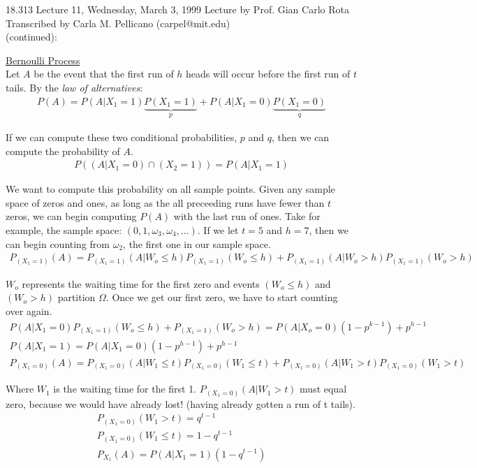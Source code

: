 {\Large 18.313 Lecture 11, Wednesday, March 3, 1999}\newline
{\large Lecture by Prof. Gian Carlo Rota}\\
Transcribed by Carla M. Pellicano (carpel@mit.edu)\\

 (continued):

\noindent\underline{Bernoulli Process}\\
Let $A$ be the event that the first run of $h$ heads will occur before the first run of $t$ tails.  By the {\em law of alternatives}:
\begin{eqnarray*}
P(A)=P(A|X_1=1)\underbrace{P(X_1=1)}_{p}+P(A|X_1=0)\underbrace{P(X_1=0)}_{q}
\end{eqnarray*}

If we can compute these two conditional probabilities, $p$ and $q$, then we can compute the probability of $A$. 
\begin{eqnarray*}
P((A|X_1=0)\cap(X_2=1))=P(A|X_1=1)
\end{eqnarray*}

We want to compute this probability on all sample points.  Given any sample space of zeros and ones, as long as the all preceeding runs have fewer than $t$ zeros, we can begin computing $P(A)$ with the last run of ones.  Take for example, the sample space:  $(0, 1, \omega_3, \omega_4,...)$.  If we let $t=5$ and $h=7$, then we can begin counting from $\omega_2$, the first one in our sample space.
\begin{eqnarray*}
P_{(X_1=1)}(A) = P_{(X_1=1)}(A|W_o \leq h)P_{(X_1=1)}(W_o \leq h)+P_{(X_1=1)}(A|W_o > h)P_{(X_1=1)}(W_o > h)
\end{eqnarray*}

$W_o$ represents the waiting time for the first zero and events $(W_o \leq h)$ and $(W_o > h)$ partition $\Omega$.  Once we get our first zero, we have to start counting over again.
\begin{eqnarray*}
P(A|X_1=0) P_{(X_1=1)}(W_o \leq h) + P_{(X_1=1)}(W_o > h) = P(A|X_o=0)(1-p^{k-1}) + p^{h-1} \\
P(A|X_1=1) = P(A|X_1=0)(1-p^{h-1}) + p^{h-1} \\
P_{(X_1=0)}(A) = P_{(X_1=0)}(A|W_1 \leq t) P_{(X_1=0)}(W_1 \leq t) + P_{(X_1=0)}(A|W_1 > t) P_{(X_1=0)}(W_1 > t)
\end{eqnarray*}

Where $W_1$ is the waiting time for the first 1.  $P_{(X_1=0)}(A|W_1 > t)$ must equal zero, because we would have already lost! (having already gotten a run of t tails).
\begin{eqnarray*}
P_{(X_1=0)}(W_1>t) = q^{t-1} \\
P_{(X_1=0)}(W_1 \leq t) = 1 - q^{t-1} \\
P_{X_1}(A)=P(A|X_1=1)(1-q^{t-1}) \\
\end{eqnarray*}

